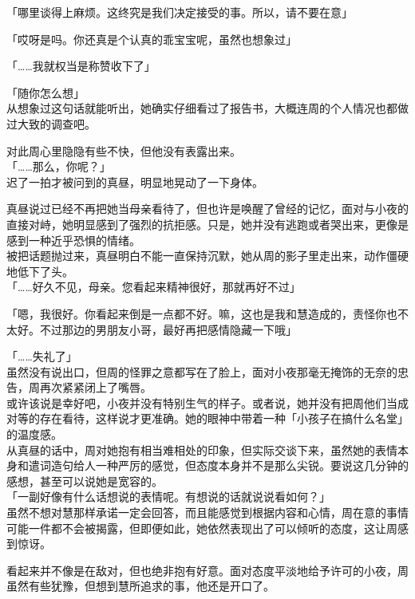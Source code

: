 「哪里谈得上麻烦。这终究是我们决定接受的事。所以，请不要在意」

「哎呀是吗。你还真是个认真的乖宝宝呢，虽然也想象过」

「……我就权当是称赞收下了」

「随你怎么想」\\

从想象过这句话就能听出，她确实仔细看过了报告书，大概连周的个人情况也都做过大致的调查吧。

对此周心里隐隐有些不快，但他没有表露出来。\\

「……那么，你呢？」\\

迟了一拍才被问到的真昼，明显地晃动了一下身体。

真昼说过已经不再把她当母亲看待了，但也许是唤醒了曾经的记忆，面对与小夜的直接对峙，她明显感到了强烈的抗拒感。只是，她并没有逃跑或者哭出来，更像是感到一种近乎恐惧的情绪。\\

被把话题抛过来，真昼明白不能一直保持沉默，她从周的影子里走出来，动作僵硬地低下了头。\\

「……好久不见，母亲。您看起来精神很好，那就再好不过」

「嗯，我很好。你看起来倒是一点都不好。嘛，这也是我和慧造成的，责怪你也不太好。不过那边的男朋友小哥，最好再把感情隐藏一下哦」

「……失礼了」\\

虽然没有说出口，但周的怪罪之意都写在了脸上，面对小夜那毫无掩饰的无奈的忠告，周再次紧紧闭上了嘴唇。\\

或许该说是幸好吧，小夜并没有特别生气的样子。或者说，她并没有把周他们当成对等的存在看待，这样说才更准确。她的眼神中带着一种「小孩子在搞什么名堂」的温度感。\\

从真昼的话中，周对她抱有相当难相处的印象，但实际交谈下来，虽然她的表情本身和遣词造句给人一种严厉的感觉，但态度本身并不是那么尖锐。要说这几分钟的感想，甚至可以说她是宽容的。\\

「一副好像有什么话想说的表情呢。有想说的话就说说看如何？」\\

虽然不想对慧那样承诺一定会回答，而且能感觉到根据内容和心情，周在意的事情可能一件都不会被揭露，但即便如此，她依然表现出了可以倾听的态度，这让周感到惊讶。

看起来并不像是在敌对，但也绝非抱有好意。面对态度平淡地给予许可的小夜，周虽然有些犹豫，但想到慧所追求的事，他还是开口了。\\

